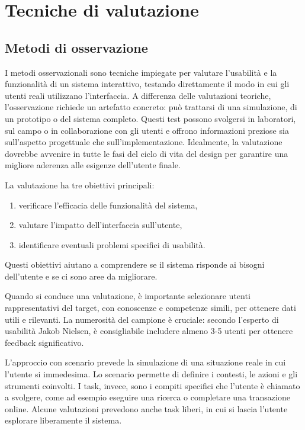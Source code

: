 \chapter{Tecniche di valutazione}
\section{Metodi di osservazione}
I metodi osservazionali sono tecniche impiegate per valutare l'usabilità e la funzionalità di un sistema interattivo, testando direttamente il modo in cui gli utenti reali utilizzano l'interfaccia. A differenza delle valutazioni teoriche, l’osservazione richiede un artefatto concreto: può trattarsi di una simulazione, di un prototipo o del sistema completo. Questi test possono svolgersi in laboratori, sul campo o in collaborazione con gli utenti e offrono informazioni preziose sia sull’aspetto progettuale che sull’implementazione. Idealmente, la valutazione dovrebbe avvenire in tutte le fasi del ciclo di vita del design per garantire una migliore aderenza alle esigenze dell'utente finale.

La valutazione ha tre obiettivi principali:
\begin{enumerate}
    \item verificare l'efficacia delle funzionalità del sistema,
    \item valutare l'impatto dell'interfaccia sull'utente,
    \item identificare eventuali problemi specifici di usabilità. 
\end{enumerate}
Questi obiettivi aiutano a comprendere se il sistema risponde ai bisogni dell'utente e se ci sono aree da migliorare.

Quando si conduce una valutazione, è importante selezionare utenti rappresentativi del target, con conoscenze e competenze simili, per ottenere dati utili e rilevanti. La numerosità del campione è cruciale: secondo l’esperto di usabilità Jakob Nielsen, è consigliabile includere almeno 3-5 utenti per ottenere feedback significativo.

L'approccio con scenario prevede la simulazione di una situazione reale in cui l'utente si immedesima. Lo scenario permette di definire i contesti, le azioni e gli strumenti coinvolti. I task, invece, sono i compiti specifici che l’utente è chiamato a svolgere, come ad esempio eseguire una ricerca o completare una transazione online. Alcune valutazioni prevedono anche task liberi, in cui si lascia l’utente esplorare liberamente il sistema.

